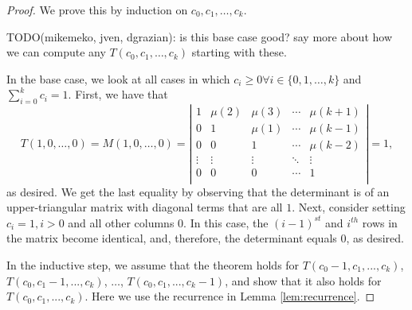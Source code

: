 \documentclass[12pt]{amsart}
\newcommand{\ifact}{\mu}
\newcommand{\M}{M}
\begin{document}
\begin{proof}
We prove this by induction on $c_0, c_1, \dots, c_k$.

TODO(mikemeko, jven, dgrazian): is this base case good? say more about how we can compute any $T(c_0, c_1, \dots, c_k)$ starting with these.

In the base case, we look at all cases in which $c_i \geq 0 \forall i \in \{0,1,\dots,k\}$ and $\sum_{i=0}^{k}{c_i} = 1$. First, we have that
$$
T(1,0,\dots,0) = \M(1,0,\dots,0)=\left|
\begin{matrix}
1 & \ifact(2) & \ifact(3) & \cdots & \ifact(k+1) \\
0 & 1 & \ifact(1) & \cdots & \ifact(k-1) \\
0 & 0 & 1 & \cdots & \ifact(k-2) \\
\vdots & \vdots & \vdots & \ddots & \vdots \\
0 & 0 & 0 & \cdots & 1 \\
\end{matrix} \right| = 1,
$$
as desired. We get the last equality by observing that the determinant is of an upper-triangular matrix with diagonal terms that are all $1$. Next, consider setting $c_i = 1, i > 0$ and all other columns $0$. In this case, the $(i-1)^{st}$ and $i^{th}$ rows in the matrix become identical, and, therefore, the determinant equals $0$, as desired.

In the inductive step, we assume that the theorem holds for $T(c_0-1,c_1,...,c_k)$, $T(c_0,c_1-1,...,c_k)$, $\dots$, $T(c_0,c_1,...,c_k-1)$, and show that it also holds for $T(c_0,c_1,...,c_k)$. Here we use the recurrence in Lemma \ref{lem:recurrence}.


\end{proof}
\end{document}
